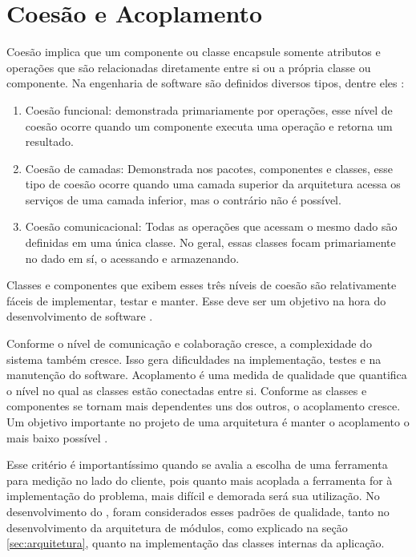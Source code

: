 \documentclass[12pt]{tcc}
\begin{document}
		\section{Coesão e Acoplamento}
		\label{section:coesao-e-acoplamento}

		Coesão implica que um componente ou classe encapsule somente atributos e operações que são relacionadas diretamente entre si ou a própria classe ou componente. Na engenharia de software são definidos diversos tipos, dentre eles \citep{pressman2009software}:

		\begin{enumerate}
			\item Coesão funcional: demonstrada primariamente por operações, esse nível de coesão ocorre quando um componente executa uma operação e retorna um resultado.
			\item Coesão de camadas: Demonstrada nos pacotes, componentes e classes, esse tipo de coesão ocorre quando uma camada superior da arquitetura acessa os serviços de uma camada inferior, mas o contrário não é possível.
			\item Coesão comunicacional: Todas as operações que acessam o mesmo dado são definidas em uma única classe. No geral, essas classes focam primariamente no dado em sí, o acessando e armazenando.
		\end{enumerate}

		Classes e componentes que exibem esses três níveis de coesão são relativamente fáceis de implementar, testar e manter. Esse deve ser um objetivo na hora do desenvolvimento de software \citep{pressman2009software}.
		
		Conforme o nível de comunicação e colaboração cresce, a complexidade do sistema também cresce. Isso gera dificuldades na implementação, testes e na manutenção do software. Acoplamento é uma medida de qualidade que quantifica o nível no qual as classes estão conectadas entre si. Conforme as classes e componentes se tornam mais dependentes uns dos outros, o acoplamento cresce. Um objetivo importante no projeto de uma arquitetura é manter o acoplamento o mais baixo possível \citep{pressman2009software}.

		Esse critério é importantíssimo quando se avalia a escolha de uma ferramenta para medição no lado do cliente, pois quanto mais acoplada a ferramenta for à implementação do problema, mais difícil e demorada será sua utilização. No desenvolvimento do , foram considerados esses padrões de qualidade, tanto no desenvolvimento da arquitetura de módulos, como explicado na seção \ref{sec:arquitetura}, quanto na implementação das classes internas da aplicação. 
\end{document}
